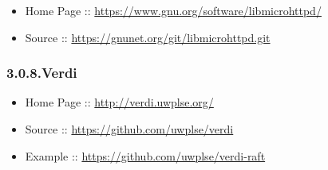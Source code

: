 \documentclass[12pt,twoside]{article}
\begin{document}
\begin{itemize}[noitemsep,topsep=\mdcompacttopsep]%

\item{}Home Page :: \href{https://www.gnu.org/software/libmicrohttpd/}{{\ttfamily https://\hspace{0pt}www.\hspace{0pt}gnu.\hspace{0pt}org/\hspace{0pt}software/\hspace{0pt}libmicrohttpd/\hspace{0pt}}}%

\item{}Source :: \href{https://gnunet.org/git/libmicrohttpd.git}{{\ttfamily https://\hspace{0pt}gnunet.\hspace{0pt}org/\hspace{0pt}git/\hspace{0pt}libmicrohttpd.\hspace{0pt}git}}%
\end{itemize}%

\subsubsection{3.0.8.\hspace*{0.5em}Verdi}\label{sec-verdi}%

\begin{itemize}[noitemsep,topsep=\mdcompacttopsep]%

\item{}Home Page :: \href{http://verdi.uwplse.org/}{{\ttfamily http://\hspace{0pt}verdi.\hspace{0pt}uwplse.\hspace{0pt}org/\hspace{0pt}}}%

\item{}Source :: \href{https://github.com/uwplse/verdi}{{\ttfamily https://\hspace{0pt}github.\hspace{0pt}com/\hspace{0pt}uwplse/\hspace{0pt}verdi}}%

\item{}Example :: \href{https://github.com/uwplse/verdi-raft}{{\ttfamily https://\hspace{0pt}github.\hspace{0pt}com/\hspace{0pt}uwplse/\hspace{0pt}verdi-\hspace{0pt}raft}}%
\end{itemize}%
\end{document}
